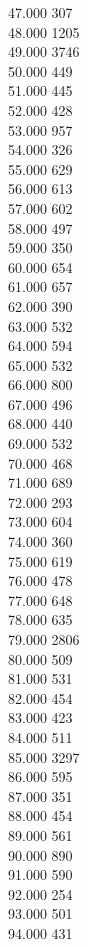 { 47.000	307 \\
 48.000	1205 \\
 49.000	3746 \\
 50.000	449 \\
 51.000	445 \\
 52.000	428 \\
 53.000	957 \\
 54.000	326 \\
 55.000	629 \\
 56.000	613 \\
 57.000	602 \\
 58.000	497 \\
 59.000	350 \\
 60.000	654 \\
 61.000	657 \\
 62.000	390 \\
 63.000	532 \\
 64.000	594 \\
 65.000	532 \\
 66.000	800 \\
 67.000	496 \\
 68.000	440 \\
 69.000	532 \\
 70.000	468 \\
 71.000	689 \\
 72.000	293 \\
 73.000	604 \\
 74.000	360 \\
 75.000	619 \\
 76.000	478 \\
 77.000	648 \\
 78.000	635 \\
 79.000	2806 \\
 80.000	509 \\
 81.000	531 \\
 82.000	454 \\
 83.000	423 \\
 84.000	511 \\
 85.000	3297 \\
 86.000	595 \\
 87.000	351 \\
 88.000	454 \\
 89.000	561 \\
 90.000	890 \\
 91.000	590 \\
 92.000	254 \\
 93.000	501 \\
 94.000	431 \\
}
